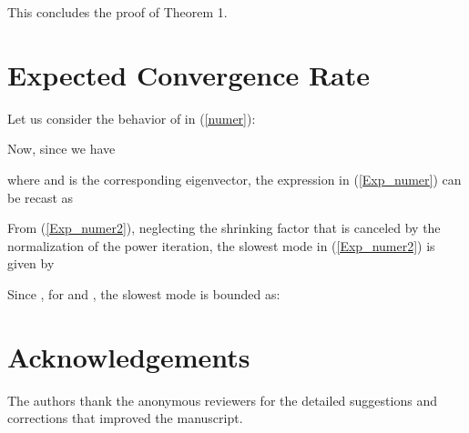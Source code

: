 \documentclass[10pt,twocolumn]{IEEEtran}
\begin{document}
This concludes the proof of Theorem 1.



\section{Expected Convergence Rate}

Let us consider the behavior of  in (\ref{numer}):

Now, since we have

where  and  is the corresponding eigenvector, the expression in (\ref{Exp_numer}) can be recast as

From (\ref{Exp_numer2}), neglecting the shrinking factor  that is canceled by the normalization of the power iteration, the slowest mode in (\ref{Exp_numer2}) is given by

Since , for  and , the slowest mode  is bounded as:



\section*{Acknowledgements}

The authors thank the anonymous reviewers for the detailed suggestions and corrections that improved the manuscript.
\end{document}
